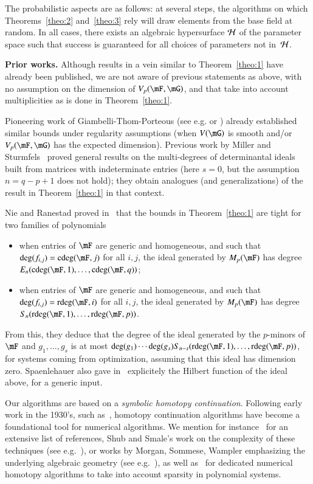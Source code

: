 The probabilistic aspects are as follows: at several steps, the
algorithms on which Theorems~\ref{theo:2} and~\ref{theo:3} rely will
draw elements from the base field at random. In all cases, there
exists an algebraic hypersurface $\cal H$ of the parameter space such
that success is guaranteed for all choices of parameters not
in~$\cal H$.

{\bf Prior works.} Although results in a vein similar to Theorem~\ref{theo:1}
have already been published, we are not aware of previous statements as above,
with no assumption on the dimension of $V_p(\mF,\mG)$, and that take into
account multiplicities as is done in Theorem~\ref{theo:1}.

Pioneering work of Giambelli-Thom-Porteous (see e.g. \cite{FP06} or
\cite{Fu92}) already established similar bounds under regularity
assumptions (when $V(\mG)$ is smooth and/or $V_p(\mF, \mG)$ has the
expected dimension). Previous work by Miller and
Sturmfels~\cite[Chapter~15]{MiSt04} proved general results on the
multi-degrees of determinantal ideals built from matrices with
indeterminate entries (here $s=0$, but the assumption
$n=q-p+1$ does not hold); they obtain analogues (and
generalizations) of the result in Theorem~\ref{theo:1} in that
context.

Nie and Ranestad proved in~\cite{NieRan09} that the bounds in
Theorem~\ref{theo:1} are tight for two families of polynomials
\begin{itemize}
\item when entries of $\mF$ are generic and homogeneous, and
 such that $\deg(f_{i,j}) = \cdeg(\mF,j)$ for all $i,j$, the ideal
 generated by $M_p(\mF)$ has degree $E_{n}(\cdeg(\mF,1), \ldots, \cdeg(\mF,q))$;
\item when entries of $\mF$ are generic and homogeneous, and such that
  $\deg(f_{i,j}) = \rdeg(\mF,i)$ for all $i,j$, the ideal generated by
  $M_p(\mF)$ has degree $S_{n}(\rdeg(\mF,1), \ldots, \rdeg(\mF,p))$.
\end{itemize}
From this, they deduce that the degree of the ideal generated by the
$p$-minors of $\mF$ and $ g_1,\dots,g_s $ is at most \sloppy
$\deg(g_1) \cdots \deg(g_s) S_{n-s}(\rdeg(\mF,1), \ldots,
\rdeg(\mF,p))$, for systems coming from optimization, assuming that
this ideal has dimension zero. Spaenlehauer also gave
in~\cite{Spa14} explicitely the Hilbert function of the
ideal above, for a generic input.


Our algorithms are based on a {\em symbolic homotopy continuation}. Following
early work in the 1930's, such as~\cite{Lahaye34}, homotopy continuation
algorithms have become a foundational tool for numerical algorithms. We mention for
instance~\cite{AlGe03} for an extensive list of references, Shub and Smale's
work on the complexity of these techniques (see e.g.~\cite{ShSm93}), or
works by Morgan, Sommese, Wampler emphasizing the underlying algebraic geometry
(see e.g.~\cite{BertiniBook,SoWa05}), as well
as~\cite{Ver94,Ver09,AdVe13} for dedicated numerical homotopy algorithms to take
into account sparsity in polynomial systems.

